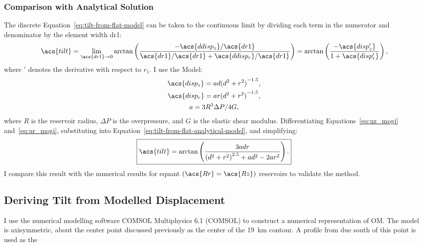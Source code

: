 
\subsubsection{Comparison with Analytical Solution}
The discrete Equation~\eqref{eq:tilt-from-flat-model} can be taken to the continuous limit by dividing each term in the numerator and denominator by the element width \acs{dr1}:
\begin{equation}
\acs{tilt}
    = \lim_{\acs{dr1}\to0} 
    \arctan\left(\dfrac{-\acs{ddisp_z}/\acs{dr1}}{\acs{dr1}/\acs{dr1}
    + \acs{ddisp_r}/\acs{dr1}}\right) = 
    \arctan\left(\dfrac{-\acs{disp_z'}}{1+\acs{disp_r'}}\right),\label{eq:tilt-from-flat-analytical-model}
\end{equation}
where $'$ denotes the derivative with respect to $r_1$. I use the \textcite{mogi_relations_1958} Model:
\begin{gather}
    \acs{disp_z} = ad{(d^2+r^2)}^{-1.5},\label{eq:uz_mogi}\\
    \acs{disp_r} = ar{(d^2+r^2)}^{-1.5},\label{eq:ur_mogi}\\
    a = {3R^3\Delta P}/{4G},\nonumber
\end{gather}
where $R$ is the reservoir radius, $\Delta P$ is the overpressure, and $G$ is the elastic shear modulus. Differentiating Equations~\eqref{eq:uz_mogi} and~\eqref{eq:ur_mogi}, substituting into Equation~\eqref{eq:tilt-from-flat-analytical-model}, and simplifying:
\begin{equation}
    \boxed{\acs{tilt} = \arctan\left(\frac{3adr}{{(d^2+r^2)}^{2.5}+ad^2-2ar^2}\right).}\label{eq:tilt-from-mogi-model}
\end{equation}
I compare this result with the numerical results for equant $(\acs{Rr}=\acs{Rz})$ reservoirs to validate the method.

\subsection{Deriving Tilt from Modelled Displacement}

I use the numerical modelling software COMSOL Multiphysics 6.1 (COMSOL) to construct a numerical representation of \acl{OM}. The model is axisymmetric, about the center point discussed previously as the center of the \qty{19}{\km} contour. A profile from due south of this point is used as the 

